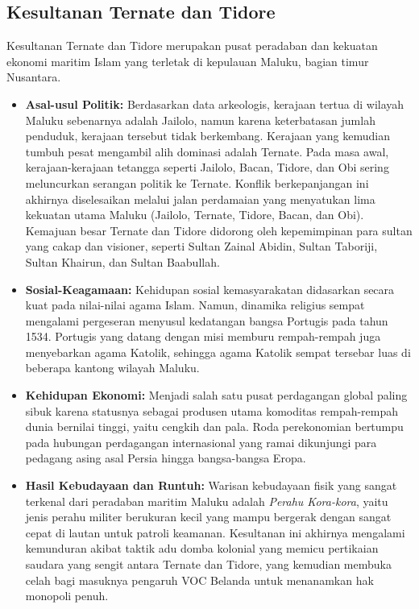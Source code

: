 \documentclass[12pt, a4paper]{article}
\begin{document}
\subsection{Kesultanan Ternate dan Tidore}
Kesultanan Ternate dan Tidore merupakan pusat peradaban dan kekuatan ekonomi maritim Islam yang terletak di kepulauan Maluku, bagian timur Nusantara.
\begin{itemize}
	\item \textbf{Asal-usul Politik:} Berdasarkan data arkeologis, kerajaan tertua di wilayah Maluku sebenarnya adalah Jailolo, namun karena keterbatasan jumlah penduduk, kerajaan tersebut tidak berkembang. Kerajaan yang kemudian tumbuh pesat mengambil alih dominasi adalah Ternate. Pada masa awal, kerajaan-kerajaan tetangga seperti Jailolo, Bacan, Tidore, dan Obi sering meluncurkan serangan politik ke Ternate. Konflik berkepanjangan ini akhirnya diselesaikan melalui jalan perdamaian yang menyatukan lima kekuatan utama Maluku (Jailolo, Ternate, Tidore, Bacan, dan Obi). Kemajuan besar Ternate dan Tidore didorong oleh kepemimpinan para sultan yang cakap dan visioner, seperti Sultan Zainal Abidin, Sultan Taboriji, Sultan Khairun, dan Sultan Baabullah.
	\item \textbf{Sosial-Keagamaan:} Kehidupan sosial kemasyarakatan didasarkan secara kuat pada nilai-nilai agama Islam. Namun, dinamika religius sempat mengalami pergeseran menyusul kedatangan bangsa Portugis pada tahun 1534. Portugis yang datang dengan misi memburu rempah-rempah juga menyebarkan agama Katolik, sehingga agama Katolik sempat tersebar luas di beberapa kantong wilayah Maluku.
	\item \textbf{Kehidupan Ekonomi:} Menjadi salah satu pusat perdagangan global paling sibuk karena statusnya sebagai produsen utama komoditas rempah-rempah dunia bernilai tinggi, yaitu cengkih dan pala. Roda perekonomian bertumpu pada hubungan perdagangan internasional yang ramai dikunjungi para pedagang asing asal Persia hingga bangsa-bangsa Eropa.
	\item \textbf{Hasil Kebudayaan dan Runtuh:} Warisan kebudayaan fisik yang sangat terkenal dari peradaban maritim Maluku adalah \textit{Perahu Kora-kora}, yaitu jenis perahu militer berukuran kecil yang mampu bergerak dengan sangat cepat di lautan untuk patroli keamanan. Kesultanan ini akhirnya mengalami kemunduran akibat taktik adu domba kolonial yang memicu pertikaian saudara yang sengit antara Ternate dan Tidore, yang kemudian membuka celah bagi masuknya pengaruh VOC Belanda untuk menanamkan hak monopoli penuh.
\end{itemize}
\end{document}
